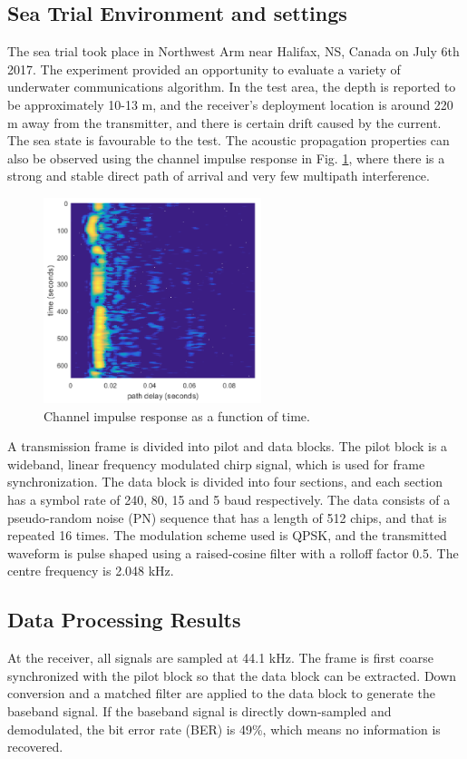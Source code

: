 \documentclass[journal,comsoc]{IEEEtran}
\begin{document}
\subsection{Sea Trial Environment and settings}
The sea trial took place in Northwest Arm near Halifax, NS, Canada on July 6th 2017. The experiment provided an opportunity to evaluate a variety of underwater communications algorithm.
In the test area, the depth is reported to be approximately 10-13 m, and the receiver's deployment location is around 220 m away from the transmitter, and there is certain drift caused by the current.
The sea state is favourable to the test. The acoustic propagation properties can also be observed using the channel impulse response in Fig. \ref{fig:chan_impu}, where there is a strong and stable direct path of arrival and very few multipath interference.
\begin{figure}[htbp]
\centering
\includegraphics[width=2.5in]{pic/channel.png}
\caption{Channel impulse response as a function of time.}
\label{fig:chan_impu} 
\end{figure}

A transmission frame is divided into pilot and data blocks. The pilot block is a wideband, linear frequency modulated chirp signal, which is used for frame synchronization.
The data block is divided into four sections, and each section has a symbol rate of 240, 80, 15 and 5 baud respectively. The data consists of a pseudo-random noise (PN) sequence that has a length of 512 chips, and that is repeated 16 times.
The modulation scheme used is QPSK, and the transmitted waveform is pulse shaped using a raised-cosine filter with a rolloff factor 0.5. The centre frequency is 2.048 kHz. 

\subsection{Data Processing Results}
\label{sec:results}
At the receiver, all signals are sampled at 44.1 kHz. The frame is first coarse synchronized with the pilot block so that the data block can be extracted.
Down conversion and a matched filter are applied to the data block to generate the baseband signal.
If the baseband signal is directly down-sampled and demodulated, the bit error rate (BER) is 49\%, which means no information is recovered.
\end{document}
